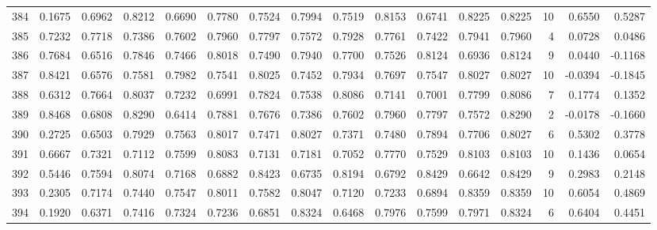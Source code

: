 \begin{tabular}{lrrrrrrrrrrrrrrr}
384 &      0.1675 &  0.6962 &  0.8212 &  0.6690 &  0.7780 &  0.7524 &  0.7994 &  0.7519 &  0.8153 &  0.6741 &   0.8225 &     0.8225 &     10 &                    0.6550 &                     0.5287 \\
385 &      0.7232 &  0.7718 &  0.7386 &  0.7602 &  0.7960 &  0.7797 &  0.7572 &  0.7928 &  0.7761 &  0.7422 &   0.7941 &     0.7960 &      4 &                    0.0728 &                     0.0486 \\
386 &      0.7684 &  0.6516 &  0.7846 &  0.7466 &  0.8018 &  0.7490 &  0.7940 &  0.7700 &  0.7526 &  0.8124 &   0.6936 &     0.8124 &      9 &                    0.0440 &                    -0.1168 \\
387 &      0.8421 &  0.6576 &  0.7581 &  0.7982 &  0.7541 &  0.8025 &  0.7452 &  0.7934 &  0.7697 &  0.7547 &   0.8027 &     0.8027 &     10 &                   -0.0394 &                    -0.1845 \\
388 &      0.6312 &  0.7664 &  0.8037 &  0.7232 &  0.6991 &  0.7824 &  0.7538 &  0.8086 &  0.7141 &  0.7001 &   0.7799 &     0.8086 &      7 &                    0.1774 &                     0.1352 \\
389 &      0.8468 &  0.6808 &  0.8290 &  0.6414 &  0.7881 &  0.7676 &  0.7386 &  0.7602 &  0.7960 &  0.7797 &   0.7572 &     0.8290 &      2 &                   -0.0178 &                    -0.1660 \\
390 &      0.2725 &  0.6503 &  0.7929 &  0.7563 &  0.8017 &  0.7471 &  0.8027 &  0.7371 &  0.7480 &  0.7894 &   0.7706 &     0.8027 &      6 &                    0.5302 &                     0.3778 \\
391 &      0.6667 &  0.7321 &  0.7112 &  0.7599 &  0.8083 &  0.7131 &  0.7181 &  0.7052 &  0.7770 &  0.7529 &   0.8103 &     0.8103 &     10 &                    0.1436 &                     0.0654 \\
392 &      0.5446 &  0.7594 &  0.8074 &  0.7168 &  0.6882 &  0.8423 &  0.6735 &  0.8194 &  0.6792 &  0.8429 &   0.6642 &     0.8429 &      9 &                    0.2983 &                     0.2148 \\
393 &      0.2305 &  0.7174 &  0.7440 &  0.7547 &  0.8011 &  0.7582 &  0.8047 &  0.7120 &  0.7233 &  0.6894 &   0.8359 &     0.8359 &     10 &                    0.6054 &                     0.4869 \\
394 &      0.1920 &  0.6371 &  0.7416 &  0.7324 &  0.7236 &  0.6851 &  0.8324 &  0.6468 &  0.7976 &  0.7599 &   0.7971 &     0.8324 &      6 &                    0.6404 &                     0.4451 \\

\end{tabular}

